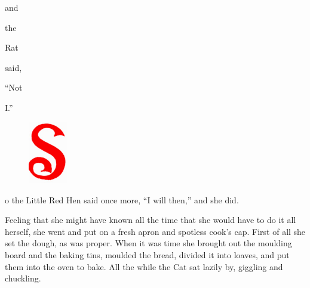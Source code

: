 \documentclass[letterpaper, 10pt, openany]{memoir}
\begin{document}
and

\vspace{\onelineskip}

the

\vspace{\onelineskip}

Rat

\vspace{\onelineskip}

said,

\vspace{\onelineskip}

``Not

\vspace{\onelineskip}

I.''

\newpage
\begin{figure}
	\includegraphics[width=0.15\textwidth]{image_012_1.jpg}
\end{figure}

o the Little Red Hen said once more, ``I will then,'' and she did.

\vspace{\onelineskip}

Feeling that she might have known all the time that she would have to do it all herself, she went and put on a fresh apron and spotless cook's cap. First of all she set the dough, as was proper. When it was time she brought out the moulding board and the baking tins, moulded the bread, divided it into loaves, and put them into the oven to bake. All the while the Cat sat lazily by, giggling and chuckling.
\end{document}
